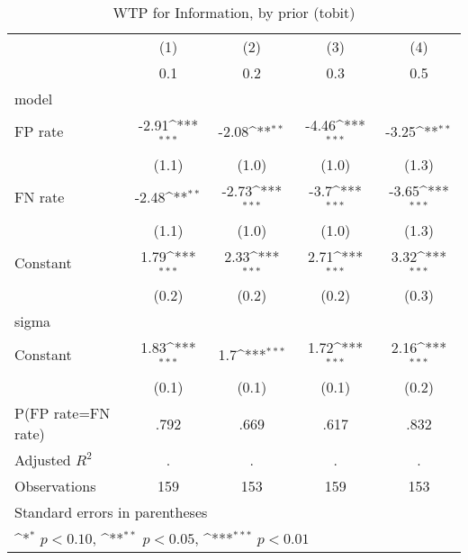 \begin{table}[htbp]\centering
\def\sym#1{\ifmmode^{#1}\else\(^{#1}\)\fi}
\caption{WTP for Information, by prior (tobit)}
\begin{tabular}{l*{4}{c}}
\hline\hline
                &\multicolumn{1}{c}{(1)}&\multicolumn{1}{c}{(2)}&\multicolumn{1}{c}{(3)}&\multicolumn{1}{c}{(4)}\\
                &\multicolumn{1}{c}{0.1}&\multicolumn{1}{c}{0.2}&\multicolumn{1}{c}{0.3}&\multicolumn{1}{c}{0.5}\\
\hline
model           &                  &                  &                  &                  \\
FP rate         &    -2.91\sym{***}&    -2.08\sym{**} &    -4.46\sym{***}&    -3.25\sym{**} \\
                &    (1.1)         &    (1.0)         &    (1.0)         &    (1.3)         \\
FN rate         &    -2.48\sym{**} &    -2.73\sym{***}&     -3.7\sym{***}&    -3.65\sym{***}\\
                &    (1.1)         &    (1.0)         &    (1.0)         &    (1.3)         \\
Constant        &     1.79\sym{***}&     2.33\sym{***}&     2.71\sym{***}&     3.32\sym{***}\\
                &    (0.2)         &    (0.2)         &    (0.2)         &    (0.3)         \\
\hline
sigma           &                  &                  &                  &                  \\
Constant        &     1.83\sym{***}&      1.7\sym{***}&     1.72\sym{***}&     2.16\sym{***}\\
                &    (0.1)         &    (0.1)         &    (0.1)         &    (0.2)         \\
\hline
P(FP rate=FN rate)&     .792         &     .669         &     .617         &     .832         \\
Adjusted \(R^{2}\)&        .         &        .         &        .         &        .         \\
Observations    &      159         &      153         &      159         &      153         \\
\hline\hline
\multicolumn{5}{l}{\footnotesize Standard errors in parentheses}\\
\multicolumn{5}{l}{\footnotesize \sym{*} \(p<0.10\), \sym{**} \(p<0.05\), \sym{***} \(p<0.01\)}\\
\end{tabular}
\end{table}
